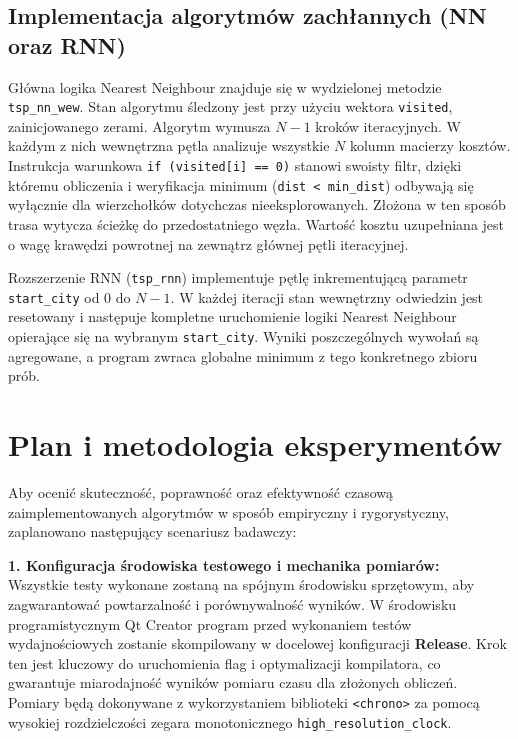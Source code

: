\documentclass[12pt, a4paper]{article}
\begin{document}
	\subsection{Implementacja algorytmów zachłannych (NN oraz RNN)}
	Główna logika Nearest Neighbour znajduje się w wydzielonej metodzie \texttt{tsp\_nn\_wew}. 
	Stan algorytmu śledzony jest przy użyciu wektora \texttt{visited}, zainicjowanego zerami. Algorytm wymusza $N-1$ kroków iteracyjnych. W każdym z nich wewnętrzna pętla analizuje wszystkie $N$ kolumn macierzy kosztów. Instrukcja warunkowa \texttt{if (visited[i] == 0)} stanowi swoisty filtr, dzięki któremu obliczenia i weryfikacja minimum (\texttt{dist < min\_dist}) odbywają się wyłącznie dla wierzchołków dotychczas nieeksplorowanych. Złożona w ten sposób trasa wytycza ścieżkę do przedostatniego węzła. Wartość kosztu uzupełniana jest o wagę krawędzi powrotnej na zewnątrz głównej pętli iteracyjnej.
	
	Rozszerzenie RNN (\texttt{tsp\_rnn}) implementuje pętlę inkrementującą parametr \texttt{start\_city} od $0$ do $N-1$. W każdej iteracji stan wewnętrzny odwiedzin jest resetowany i następuje kompletne uruchomienie logiki Nearest Neighbour opierające się na wybranym \texttt{start\_city}. Wyniki poszczególnych wywołań są agregowane, a program zwraca globalne minimum z tego konkretnego zbioru prób.
	
	
	\section{Plan i metodologia eksperymentów}
	
	Aby ocenić skuteczność, poprawność oraz efektywność czasową zaimplementowanych algorytmów w sposób empiryczny i rygorystyczny, zaplanowano następujący scenariusz badawczy:
	
	\vspace{1em}
	\noindent\textbf{1. Konfiguracja środowiska testowego i mechanika pomiarów:} \\
	\indent Wszystkie testy wykonane zostaną na spójnym środowisku sprzętowym, aby zagwarantować powtarzalność i porównywalność wyników. W środowisku programistycznym Qt Creator program przed wykonaniem testów wydajnościowych zostanie skompilowany w docelowej konfiguracji \textbf{Release}. Krok ten jest kluczowy do uruchomienia flag i optymalizacji kompilatora, co gwarantuje miarodajność wyników pomiaru czasu dla złożonych obliczeń. Pomiary będą dokonywane z wykorzystaniem biblioteki \texttt{<chrono>} za pomocą wysokiej rozdzielczości zegara monotonicznego \texttt{high\_resolution\_clock}. 
	
\end{document}
